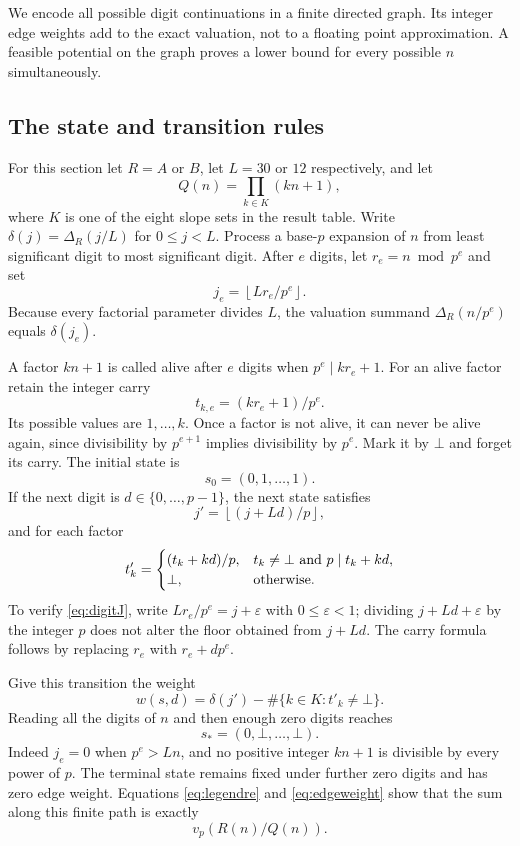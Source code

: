 \documentclass[11pt]{article}
\theoremstyle{definition}
\theoremstyle{remark}
\newcommand{\vp}{v_p}
\newcommand{\floor}[1]{\left\lfloor #1\right\rfloor}
\begin{document}
We encode all possible digit continuations in a finite directed graph.
Its integer edge weights add to the exact valuation, not to a floating
point approximation. A feasible potential on the graph proves a lower
bound for every possible $n$ simultaneously.

\subsection{The state and transition rules}
For this section let $R=A$ or $B$, let $L=30$ or $12$ respectively,
and let
\[
 Q(n)=\prod_{k\in K}(kn+1),
\]
where $K$ is one of the eight slope sets in the result table. Write
$\delta(j)=\Delta_R(j/L)$ for $0\leq j<L$.
Process a base-$p$ expansion of $n$ from least significant digit to
most significant digit. After $e$ digits, let
$r_e=n\bmod p^e$ and set
\[
 j_e=\floor{Lr_e/p^e}.
\]
Because every factorial parameter divides $L$, the valuation summand
$\Delta_R(n/p^e)$ equals $\delta(j_e)$.

A factor $kn+1$ is called alive after $e$ digits when $p^e\mid kr_e+1$.
For an alive factor retain the integer carry
\[
 t_{k,e}=(kr_e+1)/p^e.
\]
Its possible values are $1,\ldots,k$. Once a factor is not alive,
it can never be alive again, since divisibility by $p^{e+1}$ implies
divisibility by $p^e$. Mark it by $\bot$ and forget its carry.
The initial state is
\[
 s_0=(0,1,\ldots,1).
\]
If the next digit is $d\in\{0,\ldots,p-1\}$, the next state satisfies
\begin{equation}\label{eq:digitJ}
 j'=\floor{(j+Ld)/p},
\end{equation}
and for each factor
\begin{equation}\label{eq:digitCarry}
 t'_k=
 \begin{cases}
 (t_k+kd)/p,&t_k\ne\bot\ \hbox{and }p\mid t_k+kd,\\
 \bot,&\hbox{otherwise}.
 \end{cases}
\end{equation}
To verify \eqref{eq:digitJ}, write $Lr_e/p^e=j+\varepsilon$ with
$0\leq\varepsilon<1$; dividing $j+Ld+\varepsilon$ by the integer $p$
does not alter the floor obtained from $j+Ld$.
The carry formula follows by replacing $r_e$ with $r_e+d p^e$.

Give this transition the weight
\begin{equation}\label{eq:edgeweight}
 w(s,d)=\delta(j')-\#\{k\in K:t'_k\ne\bot\}.
\end{equation}
Reading all the digits of $n$ and then enough zero digits reaches
\[
 s_*=(0,\bot,\ldots,\bot).
\]
Indeed $j_e=0$ when $p^e>Ln$, and no positive integer $kn+1$ is
divisible by every power of $p$. The terminal state remains fixed under
further zero digits and has zero edge weight. Equations
\eqref{eq:legendre} and \eqref{eq:edgeweight} show that the sum along
this finite path is exactly
\begin{equation}\label{eq:pathvalue}
 \vp(R(n)/Q(n)).
\end{equation}
\end{document}

